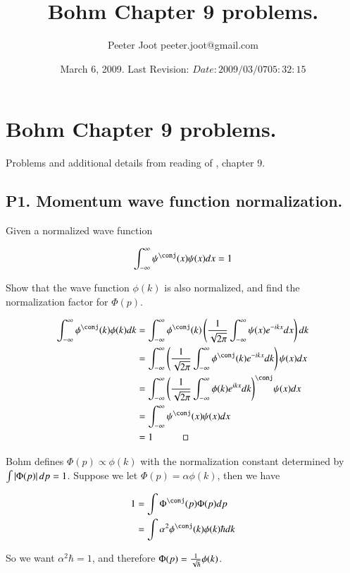 \documentclass{article}
\title{ Bohm Chapter 9 problems. }
\author{Peeter Joot \quad peeter.joot@gmail.com }
\date{ March 6, 2009.  Last Revision: $Date: 2009/03/07 05:32:15 $ }
\newcommand{\IIinf}[0]{ \int_{-\infty}^\infty }
\begin{document}
\maketitle{}

\tableofcontents

\section{ Bohm Chapter 9 problems. }

Problems and additional details from reading of \cite{bohm1989qt}, chapter 9.

\subsection{ P1. Momentum wave function normalization. }

Given a normalized wave function

\begin{align*}
\IIinf \psi^\conj(x) \psi(x) dx = 1
\end{align*}

Show that the wave function $\phi(k)$ is also normalized, and find the normalization factor for $\Phi(p)$.

\begin{align*}
\IIinf \phi^\conj(k) \phi(k) dk 
&= 
\IIinf \phi^\conj(k) \left( \inv{\sqrt{2\pi}} \IIinf \psi(x) e^{-i k x} dx \right) dk  \\
&= 
\IIinf \left( \inv{\sqrt{2\pi}} \IIinf \phi^\conj(k) e^{-i k x} dk \right) \psi(x) dx  \\
&= 
\IIinf {\left( \inv{\sqrt{2\pi}} \IIinf \phi(k) e^{i k x} dk \right)}^\conj \psi(x) dx  \\
&= 
\IIinf \psi^\conj(x) \psi(x) dx  \\
&= 1 \quad\quad\quad \square
\end{align*}

Bohm defines $\Phi(p) \propto \phi(k)$ with the normalization constant determined by $\int \left\lvert{\Phi(p)}\right\rvert dp = 1$.  Suppose we 
let $\Phi(p) = \alpha \phi(k)$, then we have

\begin{align*}
1 
&= \int \Phi^\conj(p) \Phi(p) dp \\
&= \int \alpha^2 \phi^\conj(k) \phi(k) \hbar d k
\end{align*}

So we want $\alpha^2 \hbar = 1$, and therefore $\Phi(p) = \frac{1}{\sqrt{\hbar}} \phi(k)$.
\end{document}
